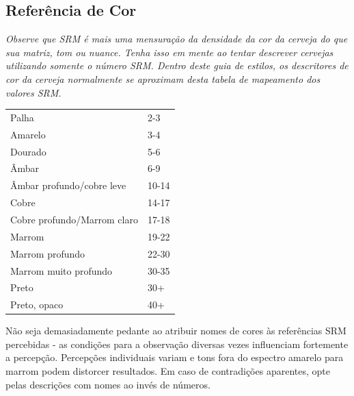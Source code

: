 \subsection*{Referência de Cor}
\textit{Observe que SRM é mais uma mensuração da densidade da cor da cerveja do que sua matriz, tom ou nuance. Tenha isso em mente ao tentar descrever cervejas utilizando somente o número SRM. Dentro deste guia de estilos, os descritores de cor da cerveja normalmente se aproximam desta tabela de mapeamento dos valores SRM.}

\begin{tabular}{ l l }
Palha & 2-3 \\
Amarelo & 3-4 \\
Dourado & 5-6 \\
Âmbar & 6-9 \\
Âmbar profundo/cobre leve & 10-14 \\
Cobre & 14-17 \\
Cobre profundo/Marrom claro & 17-18 \\
Marrom & 19-22 \\
Marrom profundo & 22-30 \\
Marrom muito profundo & 30-35 \\
Preto & 30+ \\
Preto, opaco & 40+
\end{tabular}

Não seja demasiadamente pedante ao atribuir nomes de cores às referências SRM percebidas - as condições para a observação diversas vezes influenciam fortemente a percepção. Percepções individuais variam e tons fora do espectro amarelo para marrom podem distorcer resultados. Em caso de contradições aparentes, opte pelas descrições com nomes ao invés de números.
